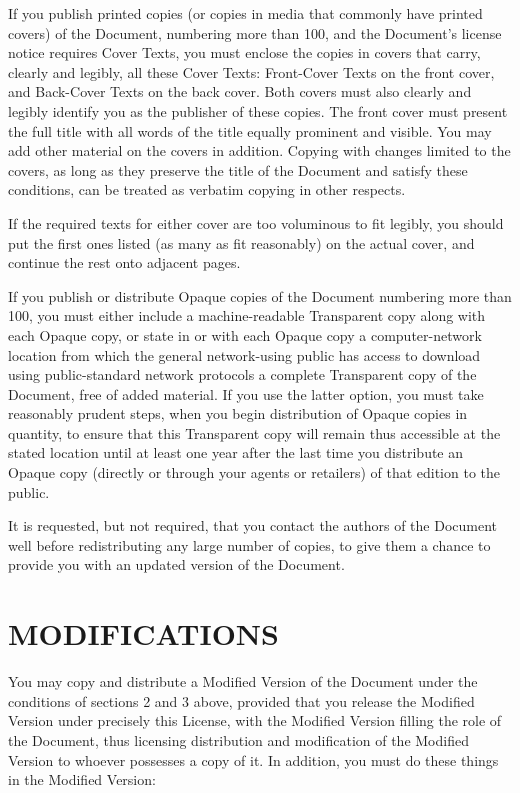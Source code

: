 If you publish printed copies (or copies in media that commonly have
printed covers) of the Document, numbering more than 100, and the
Document's license notice requires Cover Texts, you must enclose the
copies in covers that carry, clearly and legibly, all these Cover Texts:
Front-Cover Texts on the front cover, and Back-Cover Texts on the back
cover. Both covers must also clearly and legibly identify you as the
publisher of these copies. The front cover must present the full title
with all words of the title equally prominent and visible. You may add
other material on the covers in addition. Copying with changes limited
to the covers, as long as they preserve the title of the Document and
satisfy these conditions, can be treated as verbatim copying in other
respects.

If the required texts for either cover are too voluminous to fit
legibly, you should put the first ones listed (as many as fit
reasonably) on the actual cover, and continue the rest onto adjacent
pages.

If you publish or distribute Opaque copies of the Document numbering
more than 100, you must either include a machine-readable Transparent
copy along with each Opaque copy, or state in or with each Opaque copy a
computer-network location from which the general network-using public
has access to download using public-standard network protocols a
complete Transparent copy of the Document, free of added material. If
you use the latter option, you must take reasonably prudent steps, when
you begin distribution of Opaque copies in quantity, to ensure that this
Transparent copy will remain thus accessible at the stated location
until at least one year after the last time you distribute an Opaque
copy (directly or through your agents or retailers) of that edition to
the public.

It is requested, but not required, that you contact the authors of the
Document well before redistributing any large number of copies, to give
them a chance to provide you with an updated version of the Document.

\section{MODIFICATIONS}\label{modifications}

You may copy and distribute a Modified Version of the Document under the
conditions of sections 2 and 3 above, provided that you release the
Modified Version under precisely this License, with the Modified Version
filling the role of the Document, thus licensing distribution and
modification of the Modified Version to whoever possesses a copy of it.
In addition, you must do these things in the Modified Version:

